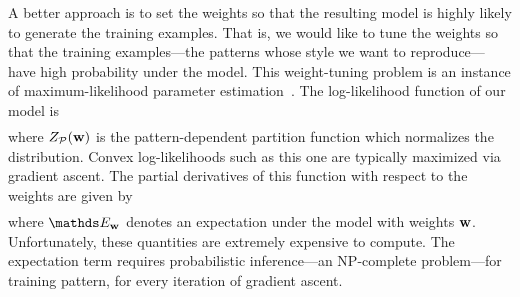 A better approach is to set the weights so that the resulting model is highly likely to generate the training examples. That is, we would like to tune the weights so that the training examples---the patterns whose style we want to reproduce---have high probability under the model. This weight-tuning problem is an instance of maximum-likelihood parameter estimation~\cite{PGMBook}. The log-likelihood function of our model is
\begin{multline*}
\end{multline*}
where $Z_{\mathcal{P}}(\mathbf{w})$ is the pattern-dependent partition function which normalizes the distribution. Convex log-likelihoods such as this one are typically maximized via gradient ascent. The partial derivatives of this function with respect to the weights are given by
\begin{multline*}
\end{multline*}
where $\expectation_\weights$ denotes an expectation under the model with weights $\mathbf{w}$. Unfortunately, these quantities are extremely expensive to compute. The expectation term requires probabilistic inference---an NP-complete problem---for training pattern, for every iteration of gradient ascent.

